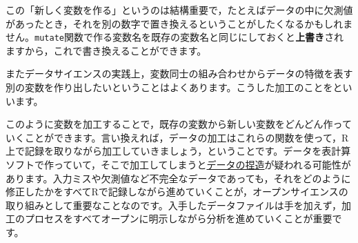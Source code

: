 \documentclass{ltjsbook}
\begin{document}
この「新しく変数を作る」というのは結構重要で，たとえばデータの中に欠測値があったとき，それを別の数字で置き換えるということがしたくなるかもしれません。\verb|mutate|関数で作る変数名を既存の変数名と同じにしておくと\textbf{上書き}されますから，これで書き換えることができます。

またデータサイエンスの実践上，変数同士の組み合わせからデータの特徴を表す別の変数を作り出したいということはよくあります。こうした加工のことをといいます。

このように変数を加工することで，既存の変数から新しい変数をどんどん作っていくことができます。言い換えれば，データの加工はこれらの関数を使って，R上で記録を取りながら加工していきましょう，ということです。データを表計算ソフトで作っていて，そこで加工してしまうと\underline{データの捏造}が疑われる可能性があります。入力ミスや欠測値など不完全なデータであっても，それをどのように修正したかをすべてRで記録しながら進めていくことが，オープンサイエンスの取り組みとして重要なことなのです。入手したデータファイルは手を加えず，加工のプロセスをすべてオープンに明示しながら分析を進めていくことが重要です。
\end{document}
